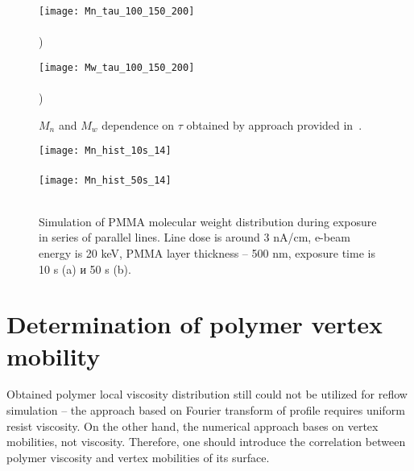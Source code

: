 \documentclass[12pt, letterpaper]{article}
\begin{document}
\begin{figure}\label{fig:Mn_Mw_tau}
	\begin{minipage}{0.48\textwidth}
		\texttt{[image: Mn\_tau\_100\_150\_200]} \\
		\vspace{-13em} \\ ) \\ \vspace{13em}
	\end{minipage}
	\begin{minipage}{0.48\textwidth}
		\texttt{[image: Mw\_tau\_100\_150\_200]} \\
		\vspace{-13em} \\ ) \\ \vspace{13em}
	\end{minipage}
	\vspace{-4em}
	\caption{$M_n$ and $M_w$ dependence on $\tau$ obtained by approach provided in~\cite{Boyd_3}.}
\end{figure}


\begin{figure}[h]\label{fig:Mn_hist}
	\begin{center}
		\texttt{[image: Mn\_hist\_10s\_14]} \\
		\vspace{-3.7em}  \vspace{2.7em} \\
		\texttt{[image: Mn\_hist\_50s\_14]} \\
		\vspace{-3.7em}  \vspace{3.7em} \\
	\end{center}
	\vspace{-2.5em}
	\caption{Simulation of PMMA molecular weight distribution during exposure in series of parallel lines. Line dose is around 3 nA/cm, e-beam energy is 20 keV, PMMA layer thickness -- 500 nm, exposure time is 10 s (a) и 50 s (b).}
\end{figure}


\section{Determination of polymer vertex mobility}
Obtained polymer local viscosity distribution still could not be utilized for reflow simulation -- the approach based on Fourier transform of profile requires uniform resist viscosity. On the other hand, the numerical approach bases on vertex mobilities, not viscosity. Therefore, one should introduce the correlation between polymer viscosity and vertex mobilities of its surface.
\end{document}
